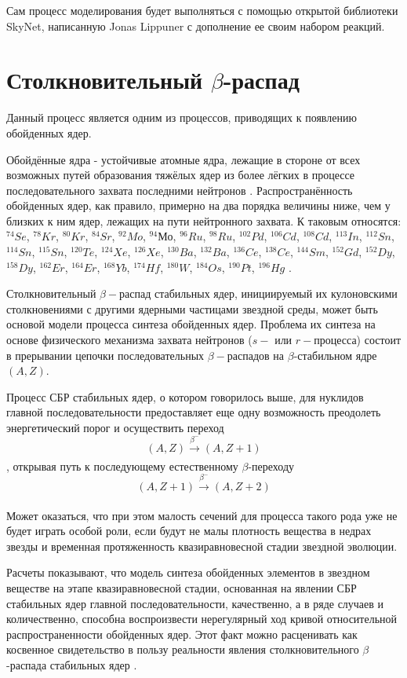 \documentclass[%
master,    %
natbib,      %
subf,        %
href,        %
colorlinks,  %
]{disser}
\begin{document}
Сам процесс моделирования будет выполняться с помощью открытой библиотеки SkyNet, написанную Jonas Lippuner с дополнение ее своим набором реакций.

\section{Столкновительный $\beta$-распад}
Данный процесс является одним из процессов, приводящих к появлению обойденных ядер.

Обойдённые ядра - устойчивые атомные ядра, лежащие в стороне от всех возможных путей образования тяжёлых ядер из более лёгких в процессе последовательного захвата последними нейтронов \cite{reactions}. Распространённость обойденных ядер, как правило, примерно на два порядка величины ниже, чем у близких к ним ядер, лежащих на пути нейтронного захвата. К таковым относятся: $^{74}Se$, $^{78}Kr$, $^{80}Kr$, $^{84}Sr$, $^{92}Mo$, $^{94}Мо$, $^{96}Ru$, $^{98}Ru$, $^{102}Pd$, $^{106}Cd$, $^{108}Cd$, $^{113}In$, $^{112}Sn$, $^{114}Sn$, $^{115}Sn$, $^{120}Te$, $^{124}Xe$, $^{126}Xe$, $^{130}Ba$, $^{132}Ba$, $^{136}Ce$, $^{138}Ce$, $^{144}Sm$, $^{152}Gd$, $^{152}Dy$, $^{158}Dy$, $^{162}Er$, $^{164}Er$, $^{168}Yb$, $^{174}Hf$, $^{180}W$, $^{184}Os$, $^{190}Pt$, $^{196}Hg$ \cite{role}.

Столкновительный $\beta-$распад стабильных ядер, инициируемый их кулоновскими столкновениями с другими ядерными частицами звездной среды, может быть основой модели процесса синтеза обойденных ядер.
Проблема их синтеза на основе физического механизма захвата нейтронов ($s-$ или $r-$процесса) состоит в прерывании цепочки последовательных $\beta-$распадов на $\beta$-стабильном ядре $(A,Z)$.

Процесс СБР стабильных ядер, о котором говорилось выше, для нуклидов главной последовательности предоставляет еще одну возможность преодолеть энергетический порог и осуществить переход 
$$(A,Z) \xrightarrow[]{\beta^-} (A,Z + 1)$$
, открывая путь к последующему естественному $\beta$-переходу
$$(A,Z+1) \xrightarrow[]{\beta^-} (A,Z + 2)$$

Может оказаться, что при этом малость сечений для процесса такого рода уже не будет играть особой роли, если будут не малы плотность вещества в недрах звезды и временная протяженность квазиравновесной стадии звездной эволюции.

Расчеты показывают, что модель синтеза обойденных элементов в звездном веществе на этапе квазиравновесной стадии, основанная на явлении СБР стабильных ядер главной последовательности, качественно, а в ряде случаев и количественно, способна воспроизвести нерегулярный ход кривой относительной распространенности обойденных ядер. Этот факт можно расценивать как косвенное свидетельство в пользу реальности явления столкновительного $\beta$-распада стабильных ядер \cite{tak}.
\end{document}

